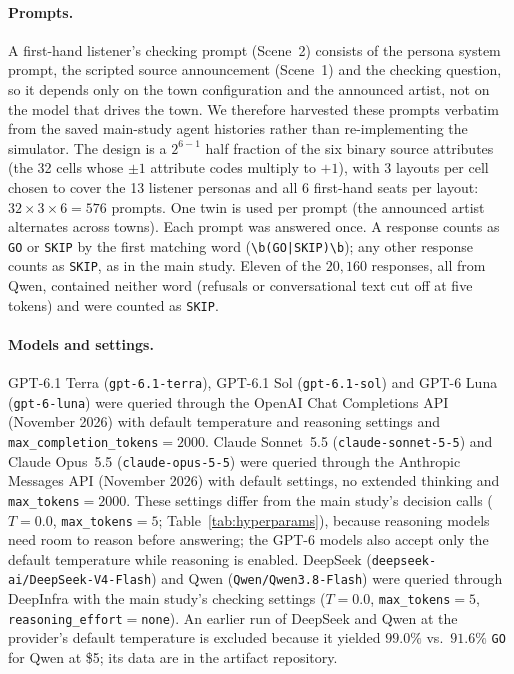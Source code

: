 \paragraph{Prompts.} A first-hand listener's checking prompt (Scene~2) consists of the persona system prompt, the scripted source announcement (Scene~1) and the checking question, so it depends only on the town configuration and the announced artist, not on the model that drives the town. We therefore harvested these prompts verbatim from the saved main-study agent histories rather than re-implementing the simulator. The design is a $2^{6-1}$ half fraction of the six binary source attributes (the 32 cells whose $\pm 1$ attribute codes multiply to $+1$), with 3 layouts per cell chosen to cover the 13 listener personas and all 6 first-hand seats per layout: $32 \times 3 \times 6 = 576$ prompts. One twin is used per prompt (the announced artist alternates across towns). Each prompt was answered once. A response counts as \texttt{GO} or \texttt{SKIP} by the first matching word (\texttt{\textbackslash b(GO|SKIP)\textbackslash b}); any other response counts as \texttt{SKIP}, as in the main study. Eleven of the $20{,}160$ responses, all from Qwen, contained neither word (refusals or conversational text cut off at five tokens) and were counted as \texttt{SKIP}.

\paragraph{Models and settings.} GPT-6.1 Terra (\texttt{gpt-6.1-terra}), GPT-6.1 Sol (\texttt{gpt-6.1-sol}) and GPT-6 Luna (\texttt{gpt-6-luna}) were queried through the OpenAI Chat Completions API (November 2026) with default temperature and reasoning settings and \texttt{max\_completion\_tokens}$=2000$. Claude Sonnet~5.5 (\texttt{claude-sonnet-5-5}) and Claude Opus~5.5 (\texttt{claude-opus-5-5}) were queried through the Anthropic Messages API (November 2026) with default settings, no extended thinking and \texttt{max\_tokens}$=2000$. These settings differ from the main study's decision calls ($T=0.0$, \texttt{max\_tokens}$=5$; Table~\ref{tab:hyperparams}), because reasoning models need room to reason before answering; the GPT-6 models also accept only the default temperature while reasoning is enabled. DeepSeek (\texttt{deepseek-ai/DeepSeek-V4-Flash}) and Qwen (\texttt{Qwen/Qwen3.8-Flash}) were queried through DeepInfra with the main study's checking settings ($T=0.0$, \texttt{max\_tokens}$=5$, \texttt{reasoning\_effort}$=$\texttt{none}). An earlier run of DeepSeek and Qwen at the provider's default temperature is excluded because it yielded $99.0\%$ vs.\ $91.6\%$ \texttt{GO} for Qwen at \$5; its data are in the artifact repository.

